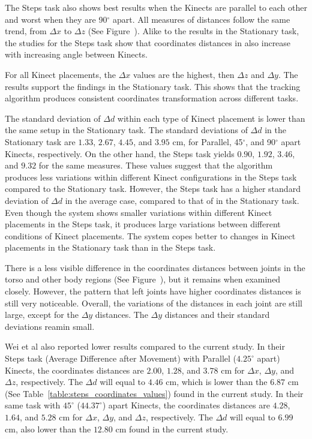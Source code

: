 The Steps task also shows best results when the Kinects are parallel to each other and worst when they are 90$^{\circ}$ apart. All measures of distances follow the same trend, from $\Delta x$ to $\Delta z$ (See Figure~). Alike to the results in the Stationary task, the studies for the Steps task show that coordinates distances in also increase with increasing angle between Kinects.

For all Kinect placements, the $\Delta x$ values are the highest, then $\Delta z$ and $\Delta y$. The results support the findings in the Stationary task. This shows that the tracking algorithm produces consistent coordinates transformation across different tasks.

The standard deviation of $\Delta d$ within each type of Kinect placement is lower than the same setup in the Stationary task. The standard deviations of $\Delta d$ in the Stationary task are $1.33$, $2.67$, $4.45$, and $3.95$ cm, for Parallel, 45$^{\circ}$, and 90$^{\circ}$ apart Kinects, respectively. On the other hand, the Steps task yields $0.90$, $1.92$, $3.46$, and $9.32$ for the same measures. These values suggest that the algorithm produces less variations within different Kinect configurations in the Steps task compared to the Stationary task. However, the Steps task has a higher standard deviation of $\Delta d$ in the average case, compared to that of in the Stationary task. Even though the system shows smaller variations within different Kinect placements in the Steps task, it produces large variations between different conditions of Kinect placements. The system copes better to changes in Kinect placements in the Stationary task than in the Steps task.

There is a less visible difference in the coordinates distances between joints in the torso and other body regions (See Figure~), but it remains when examined closely. However, the pattern that left joints have higher coordinates distances is still very noticeable. Overall, the variations of the distances in each joint are still large, except for the $\Delta y$ distances. The $\Delta y$ distances and their standard deviations reamin small.

Wei et al also reported lower results compared to the current study. In their Steps task (Average Difference after Movement) with Parallel ($4.25^{\circ}$ apart) Kinects, the coordinates distances are $2.00$, $1.28$, and $3.78$ cm for $\Delta x$, $\Delta y$, and $\Delta z$, respectively. The $\Delta d$ will equal to $4.46$ cm, which is lower than the $6.87$ cm (See Table~\ref{table:steps_coordinates_values}) found in the current study. In their same task with $45^{\circ}$ ($44.37^{\circ}$) apart Kinects, the coordinates distances are $4.28$, $1.64$, and $5.28$ cm for $\Delta x$, $\Delta y$, and $\Delta z$, respectively. The $\Delta d$ will equal to $6.99$ cm, also lower than the $12.80$ cm found in the current study.

